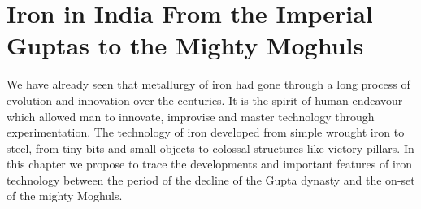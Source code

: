 \chapter{Iron in India From the Imperial Guptas to the Mighty Moghuls}\label{chapter5}


\vspace{-.3cm}

We have already seen that metallurgy of iron had gone through a long process of evolution and innovation over the centuries. It is the spirit of human endeavour which allowed man to innovate, improvise and master technology through experimentation. The technology of iron developed from simple wrought iron to steel, from tiny bits and small objects to colossal structures like victory pillars. In this chapter we propose to trace the developments and important features of iron technology between the period of the decline of the Gupta dynasty and the on-set of the mighty Moghuls. 

